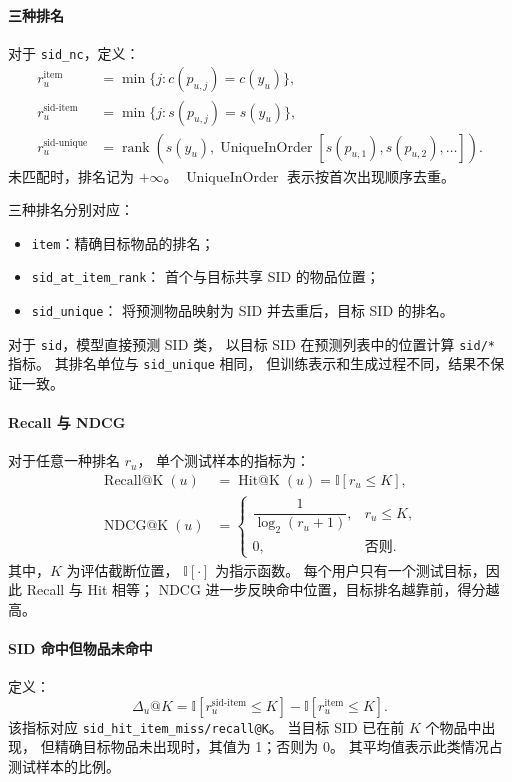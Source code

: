 \documentclass[UTF8,a4paper,zihao=-4,fontset=fandol]{ctexart}
\begin{document}
\paragraph{三种排名}
对于 \texttt{sid\_nc}，定义：
\begin{align}
    r_u^{\mathrm{item}}
    &= \min\{j:c(p_{u,j})=c(y_u)\},\\
    r_u^{\mathrm{sid\text{-}item}}
    &= \min\{j:s(p_{u,j})=s(y_u)\},\\
    r_u^{\mathrm{sid\text{-}unique}}
    &= \operatorname{rank}\!\left(
        s(y_u),
        \operatorname{UniqueInOrder}
        [s(p_{u,1}),s(p_{u,2}),\ldots]
    \right).
\end{align}
未匹配时，排名记为 $+\infty$。
$\operatorname{UniqueInOrder}$ 表示按首次出现顺序去重。

三种排名分别对应：
\begin{itemize}
    \item \texttt{item}：精确目标物品的排名；
    \item \texttt{sid\_at\_item\_rank}：
    首个与目标共享 SID 的物品位置；
    \item \texttt{sid\_unique}：
    将预测物品映射为 SID 并去重后，目标 SID 的排名。
\end{itemize}

对于 \texttt{sid}，模型直接预测 SID 类，
以目标 SID 在预测列表中的位置计算
\texttt{sid/*} 指标。
其排名单位与 \texttt{sid\_unique} 相同，
但训练表示和生成过程不同，结果不保证一致。

\paragraph{Recall 与 NDCG}
对于任意一种排名 $r_u$，
单个测试样本的指标为：
\begin{align}
    \operatorname{Recall@K}(u)
    &= \operatorname{Hit@K}(u)
     = \mathbb{I}[r_u\leq K],\\
    \operatorname{NDCG@K}(u)
    &=
    \begin{cases}
        \dfrac{1}{\log_2(r_u+1)}, & r_u\leq K,\\
        0, & \text{否则}.
    \end{cases}
\end{align}
其中，$K$ 为评估截断位置，
$\mathbb{I}[\cdot]$ 为指示函数。
每个用户只有一个测试目标，因此 Recall 与 Hit 相等；
NDCG 进一步反映命中位置，目标排名越靠前，得分越高。

\paragraph{SID 命中但物品未命中}
定义：
\[
    \Delta_u@K
    =
    \mathbb{I}[r_u^{\mathrm{sid\text{-}item}}\leq K]
    -
    \mathbb{I}[r_u^{\mathrm{item}}\leq K].
\]
该指标对应 \texttt{sid\_hit\_item\_miss/recall@K}。
当目标 SID 已在前 $K$ 个物品中出现，
但精确目标物品未出现时，其值为 1；否则为 0。
其平均值表示此类情况占测试样本的比例。
\end{document}
